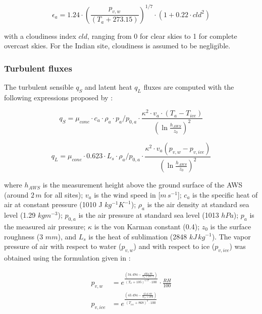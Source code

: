 \begin{equation}
	\epsilon_a=1.24 \cdot (\frac{p_{v,w}}{(T_a+273.15)})^{1/7}\cdot(1+0.22\cdot{cld}^2) \label{eqn:atm_e}
\end{equation}

with a cloudiness index $cld$, ranging from 0 for clear skies to 1 for complete overcast skies. For the Indian
site, cloudiness is assumed to be negligible.

\subsubsection{Turbulent fluxes} \label{sec:Qs}

The turbulent sensible $q_{S}$ and latent heat $q_{L}$ fluxes are computed with the following expressions
proposed by \cite{garrattAtmosphericBoundaryLayer1992}:

\begin{equation}
	q_{S}=\mu_{cone}\cdot c_{a} \cdot \rho_{a} \cdot p_{a}/p_{0,a} \cdot \frac{\kappa^2 \cdot v_a \cdot
		(T_a-T_{ice})}{{(\ln{\frac{h_{AWS}}{z_{0}}})}^2}
	\label{eqn:qs}
\end{equation}

\begin{equation}
	q_{L}=\mu_{cone}\cdot 0.623 \cdot L_s \cdot \rho_{a}/p_{0,a} \cdot \frac{\kappa^2 \cdot
	v_a(p_{v,w}-p_{v,ice})}{{(\ln{\frac{h_{AWS}}{z_{0}}})}^2}
\end{equation}

where $h_{AWS}$ is the measurement height above the ground surface of the \ac{AWS} (around $2\,m$ for all sites);
$v_a$ is the wind speed in [$m\,s^{-1}$]; $c_a$ is the specific heat of air at constant pressure (1010 J
$kg^{-1} K^{-1}$); $\rho_{a}$ is the air density at standard sea level (1.29 $kg m^{-3}$); $p_{0,a}$ is the air
pressure at standard sea level (1013 $hPa$); $p_{a}$ is the measured air pressure; $\kappa$ is the von Karman
constant (0.4); $z_{0}$ is the surface roughness (3 $mm$), and $L_s$ is the heat of sublimation (2848
$kJ\,kg^{-1}$). The vapor pressure of air with respect to water ($p_{v,w}$) and with respect to ice
($p_{v,ice}$) was obtained using the formulation given in \cite{huangSimpleAccurateFormula2018}:

\begin{equation}
	\begin{split}
		p_{v,w}&=e^{\frac{(34.494 - \frac{4924.99}{T_{a} + 237.1})}{(T_a + 105)^{1.57} \cdot 100}} \cdot \frac{RH}{100} \\
		p_{v,ice}&=e^{\frac{(43.494 - \frac{6545.89}{T_{ice} + 278})}{(T_{ice} + 868)^{2} \cdot 100}} \\
	\end{split} \label{eqn:vp}
\end{equation}

